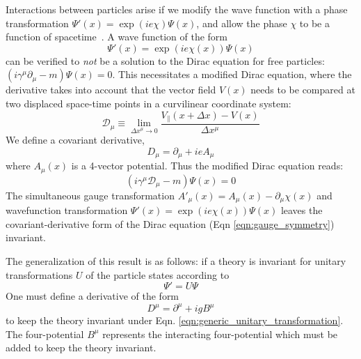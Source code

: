 Interactions between particles arise if we modify the wave function with a phase transformation $\Psi'(x) = \exp(i e \chi) \Psi(x)$, and allow the phase $\chi$ to be a function of spacetime~\cite{Tully+2012}. A wave function of the form
\begin{equation}
    \Psi'(x) = \exp(i e \chi(x)) \Psi(x)
\end{equation}
can be verified to \textit{not} be a solution to the Dirac equation for free particles: $(i \gamma^\mu \partial_\mu - m) \Psi(x) = 0$. This necessitates a modified Dirac equation, where the derivative takes into account that the vector field $V(x)$ needs to be compared at two displaced space-time points in a curvilinear coordinate system: 
\begin{equation}
    \mathcal{D}_\mu \equiv \lim_{\Delta x^\mu \rightarrow 0} \frac{V_{\parallel}(x + \Delta x) - V(x)}
{\Delta x^\mu}\end{equation}
We define a covariant derivative, 
\begin{equation}
    D_\mu = \partial_\mu + i e A_\mu
\label{eqn:modified_dirac}
\end{equation}
where $A_\mu(x)$ is a 4-vector potential. Thus the modified Dirac equation reads:
\begin{equation}
    \left( i \gamma^\mu \mathcal{D}_\mu - m  \right) \Psi(x) = 0
\end{equation}
The simultaneous gauge transformation $A'_\mu(x) = A_\mu(x) - \partial_\mu\chi(x)$ and wavefunction transformation $\Psi'(x) = \exp(ie\chi(x)) \Psi(x)$ leaves the covariant-derivative form of the Dirac equation (Eqn \ref{eqn:gauge_symmetry}) invariant.

The generalization of this result is as follows: if a theory is invariant for unitary transformations $U$ of the particle states according to 
\begin{equation}
    \Psi' = U\Psi
\label{eqn:generic_unitary_transformation}
\end{equation}
One must define a derivative of the form
\begin{equation}
    D^\mu = \partial^\mu + ig B^\mu
\end{equation}
to keep the theory invariant under Eqn. \ref{eqn:generic_unitary_transformation}. The four-potential $B^\mu$ represents the interacting four-potential which must be added to keep the theory invariant.

